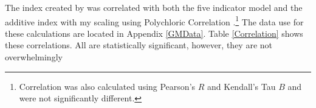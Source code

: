 \documentclass[JohnsonMADraft3.tex]{subfiles}
\begin{document}
The index created by \citet{Melton2014} was correlated with both the five indicator model and the additive index with my scaling using Polychloric Correlation \citep{Olsson1979}.\footnote{Correlation was also calculated using Pearson's $R$ and Kendall's Tau $B$ and were not significantly different.}  The data use for these calculations are located in Appendix \ref{GMData}.  Table \ref{Correlation} shows these correlations.  All are statistically significant, however, they are not overwhelmingly 
	
\end{document}
